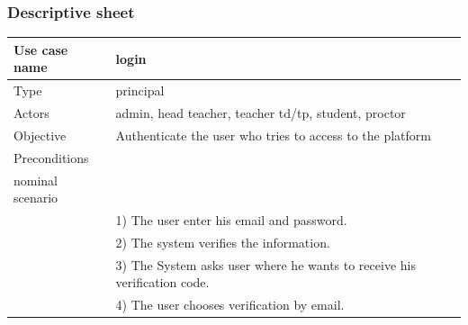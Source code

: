 \documentclass[]{uc2pfecaneva}
\begin{document}
\subsubsection{Descriptive sheet}
\begin{table}[h]
	\centering
	\begin{tabularx}{\textwidth}{|l|X|}
		\hline
		Use case name         & login                                                                                                                                                                \\ \hline
		Type                  & principal                                                                                                                                                            \\ \hline
		Actors                & admin, head teacher, teacher td/tp, student, proctor                                                                                                                 \\ \hline
		Objective             & Authenticate the user who tries to access to the platform                                                                                                            \\ \hline
		Preconditions         &                                                                                                                                                                      \\ \hline
		nominal scenario      &                                                                                                                                                                      \\
		                      & 1) The user enter his email and password.                                                                                                                            \\
		                      & 2) The system verifies the information.                                                                                                                              \\
		                      & 3) The System asks user where he wants to receive his verification code.                                                                                             \\
		                      & 4) The user chooses verification by email.                                                                                                                           \\

\end{tabularx}
\end{table}
\end{document}
